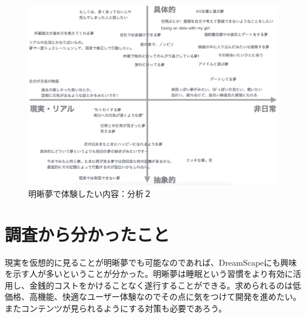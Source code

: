 \begin{figure}[htbp]
\begin{center}
\includegraphics[width=15cm]{eps/whatYouWantToDream.eps}
\caption{明晰夢で体験したい内容：分析２}
\label{desiredDreamTpye2}
\end{center}
\end{figure}

\section{調査から分かったこと}
現実を仮想的に見ることが明晰夢でも可能なのであれば、DreamScapeにも興味を示す人が多いということが分かった。明晰夢は睡眠という習慣をより有効に活用し、金銭的コストをかけることなく遂行することができる。求められるのは低価格、高機能、快適なユーザー体験なのでその点に気をつけて開発を進めたい。またコンテンツが見られるようにする対策も必要であろう。